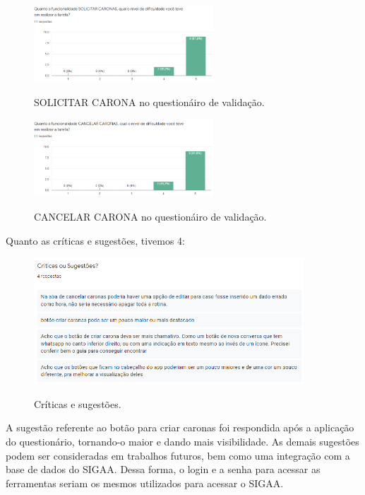 \begin{figure}[H]
	\centering
	\caption{SOLICITAR CARONA no questionáiro de validação.}
	\includegraphics[width=0.6\textwidth]{./04-figuras/validacao/solicitar_carona.png}
	\label{fig:solicitar_carona}
\end{figure}

\begin{figure}[H]
	\centering
	\caption{CANCELAR CARONA no questionáiro de validação.}
	\includegraphics[width=0.6\textwidth]{./04-figuras/validacao/cancelar_carona.png}
	\label{fig:cancela_carona}
\end{figure}

Quanto as críticas e sugestões, tivemos 4:

\begin{figure}[H]
	\centering
	\caption{Críticas e sugestões.}
	\includegraphics[width=0.9\textwidth]{./04-figuras/validacao/criticas_e_sugestoes.png}
	\label{fig:cancela_carona}
\end{figure}

A sugestão referente ao botão para criar caronas foi respondida após a aplicação do questionário, tornando-o maior e dando mais visibilidade. As demais sugestões podem ser consideradas em trabalhos futuros, bem como uma integração com a base de dados do SIGAA. Dessa forma, o login e a senha para acessar as ferramentas seriam os mesmos utilizados para acessar o SIGAA.


